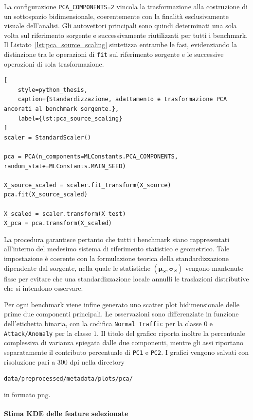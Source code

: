 La configurazione \texttt{PCA\_COMPONENTS=2} vincola la trasformazione alla costruzione di un sottospazio bidimensionale, coerentemente con la finalità esclusivamente visuale dell'analisi. 
Gli autovettori principali sono quindi determinati una sola volta sul riferimento sorgente e successivamente riutilizzati per tutti i benchmark. 
Il Listato~\ref{lst:pca_source_scaling} sintetizza entrambe le fasi, evidenziando la distinzione tra le operazioni di \texttt{fit} sul riferimento sorgente e le successive operazioni di sola trasformazione.

\begin{lstlisting}[
    style=python_thesis,
    caption={Standardizzazione, adattamento e trasformazione PCA ancorati al benchmark sorgente.},
    label={lst:pca_source_scaling}
]
scaler = StandardScaler()

pca = PCA(n_components=MLConstants.PCA_COMPONENTS, random_state=MLConstants.MAIN_SEED)

X_source_scaled = scaler.fit_transform(X_source)
pca.fit(X_source_scaled)

X_scaled = scaler.transform(X_test)
X_pca = pca.transform(X_scaled)
\end{lstlisting}

La procedura garantisce pertanto che tutti i benchmark siano rappresentati all'interno del medesimo sistema di riferimento statistico e geometrico. 
Tale impostazione è coerente con la formulazione teorica della standardizzazione dipendente dal sorgente, nella quale le statistiche $(\boldsymbol{\mu}_S,\boldsymbol{\sigma}_S)$ vengono mantenute fisse per evitare che una standardizzazione locale annulli le traslazioni distributive che si intendono osservare.

Per ogni benchmark viene infine generato uno scatter plot bidimensionale delle prime due componenti principali. 
Le osservazioni sono differenziate in funzione dell'etichetta binaria, con la codifica \texttt{Normal Traffic} per la classe $0$ e \texttt{Attack/Anomaly} per la classe $1$. 
Il titolo del grafico riporta inoltre la percentuale complessiva di varianza spiegata dalle due componenti, mentre gli assi riportano separatamente il contributo percentuale di \texttt{PC1} e \texttt{PC2}. 
I grafici vengono salvati con risoluzione pari a $300$ dpi nella directory 
\begin{center}
    \texttt{data/preprocessed/metadata/plots/pca/}
\end{center}
in formato png.

\paragraph{Stima KDE delle feature selezionate}

